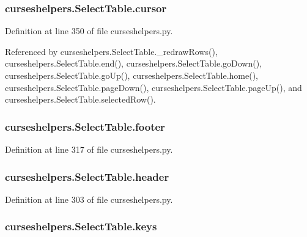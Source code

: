 \subsubsection[{cursor}]{\setlength{\rightskip}{0pt plus 5cm}curseshelpers.\-Select\-Table.\-cursor}\label{classcurseshelpers_1_1SelectTable_ac0fd218192eca9c6f808419bfbb7f27b}


Definition at line 350 of file curseshelpers.\-py.



Referenced by curseshelpers.\-Select\-Table.\-\_\-redraw\-Rows(), curseshelpers.\-Select\-Table.\-end(), curseshelpers.\-Select\-Table.\-go\-Down(), curseshelpers.\-Select\-Table.\-go\-Up(), curseshelpers.\-Select\-Table.\-home(), curseshelpers.\-Select\-Table.\-page\-Down(), curseshelpers.\-Select\-Table.\-page\-Up(), and curseshelpers.\-Select\-Table.\-selected\-Row().

\subsubsection[{footer}]{\setlength{\rightskip}{0pt plus 5cm}curseshelpers.\-Select\-Table.\-footer}\label{classcurseshelpers_1_1SelectTable_aef7e9584a763a213f50d1a86785ec8f4}


Definition at line 317 of file curseshelpers.\-py.

\subsubsection[{header}]{\setlength{\rightskip}{0pt plus 5cm}curseshelpers.\-Select\-Table.\-header}\label{classcurseshelpers_1_1SelectTable_a15d194df10420465c15c3ff4b9d30b78}


Definition at line 303 of file curseshelpers.\-py.

\subsubsection[{keys}]{\setlength{\rightskip}{0pt plus 5cm}curseshelpers.\-Select\-Table.\-keys}\label{classcurseshelpers_1_1SelectTable_ac2d5523fa574e7a8e30f23bdd9e240ce}


